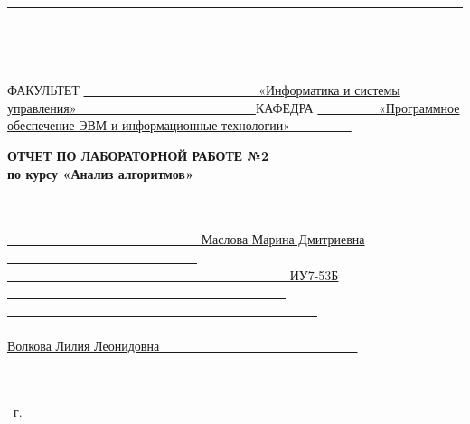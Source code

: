\begin{titlepage}
    \noindent
	\rule{17cm}{3pt}
    ~\\
    \begin{spacing}{0.1}
        ~\\
    \end{spacing}
	\noindent ФАКУЛЬТЕТ
    \uline
    {
            ~~~~~~~~~~~~~~~~~~~~~~~~~~~
            «Информатика и системы управления»
            ~~~~~~~~~~~~~~~~~~~~~~~~~~~
    }
    \newline\newline
	\noindent КАФЕДРА
    \uline{
            ~~~~~~~~~
            «Программное обеспечение ЭВМ и информационные технологии»
            ~~~~~~~~~
        }
    \newline\newline
    \newline\newline
    \newline\newline
    \newline\newline
    \newline

	\fontsize{18pt}{18pt}\selectfont
	\begin{center}
        \textbf{ОТЧЕТ ПО ЛАБОРАТОРНОЙ РАБОТЕ №2}\\
        \textbf{по курсу «Анализ алгоритмов»}\\
        ~\\
        \fontsize{16pt}{16pt}\selectfont
	\end{center}
    ~\\

	\fontsize{14pt}{14pt}\selectfont
	\noindent{}
    \uline{
        ~~~~~~~~~~~~~~~~~~~~~~~~~~~~~~
        Маслова Марина Дмитриевна
        ~~~~~~~~~~~~~~~~~~~~~~~~~~~~~~
    }
    \newline\newline
	\noindent{}
    \uline{
        ~~~~~~~~~~~~~~~~~~~~~~~~~~~~~~~~~~~~~~~~~~~~
        ИУ7-53Б
        ~~~~~~~~~~~~~~~~~~~~~~~~~~~~~~~~~~~~~~~~~~~~
    }
    \newline\newline
	\noindent{}
    \uline{
        ~~~~~~~~~~~~~~~~~~~~~~~~~~~~~~~~~~~~~~~~~~~~~~~~~
        ~~~~~~~~~~~~~~~~~~~~~~~~~~~~~~~~~~~~~~~~~~~~~~~~~
    }
    \newline\newline
	\noindent{}
    \uline{
        ~~~~~~~~~~~~~~~~~~~~
        Волкова Лилия Леонидовна
        ~~~~~~~~~~~~~~~~~~~~~~~~~~~~~~
    }
    \newline\newline
    ~\\
    ~\\
    ~\\
    \vspace{17mm}

	\begin{center}
		\the\year~г.
	\end{center}

    \restoregeometry
\end{titlepage}

